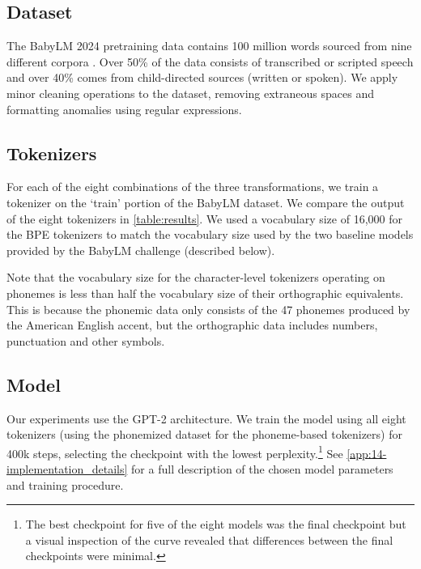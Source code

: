 \subsection{Dataset}
\label{sec:14-input}

The BabyLM 2024 pretraining data contains 100 million words sourced from nine different corpora \citep{warstadt-2023-babylm-findings}. Over 50\% of the data consists of transcribed or scripted speech and over 40\% comes from child-directed sources (written or spoken). %
We apply minor cleaning operations to the dataset, removing extraneous spaces and formatting anomalies using regular expressions.

\subsection{Tokenizers}
\label{sec:14-tokenizers}

For each of the eight combinations of the three transformations, we train a tokenizer on the `train' portion of the BabyLM dataset.
We compare the output of the eight tokenizers in \cref{table:results}. We used a vocabulary size of 16,000 for the BPE tokenizers to match the vocabulary size used by the two baseline models provided by the BabyLM challenge (described below). 

Note that the vocabulary size for the character-level tokenizers operating on phonemes is less than half the vocabulary size of their orthographic equivalents. This is because the phonemic data only consists of the 47 phonemes produced by the American English accent, but the orthographic data includes numbers, punctuation and other symbols. 

\subsection{Model}
\label{sec:14-model}

Our experiments use the GPT-2 architecture. We train the model using all eight tokenizers (using the phonemized dataset for the phoneme-based tokenizers) for 400k steps, selecting the checkpoint with the lowest perplexity.\footnote{The best checkpoint for five of the eight models was the final checkpoint but a visual inspection of the curve revealed that differences between the final checkpoints were minimal.} See \cref{app:14-implementation_details} for a full description of the chosen model parameters and training procedure.


